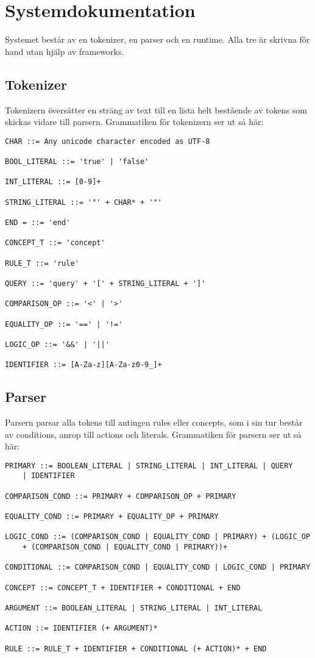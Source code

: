 \documentclass{TDP005mall}
\begin{document}
\section{Systemdokumentation}
Systemet består av en tokenizer, en parser och en runtime. Alla tre är skrivna för hand
utan hjälp av frameworks.

\subsection{Tokenizer}
Tokenizern översätter en sträng av text till en lista helt bestående av tokens som skickas
vidare till parsern. Grammatiken för tokenizern ser ut så här:

\begin{lstlisting}
CHAR ::= Any unicode character encoded as UTF-8

BOOL_LITERAL ::= 'true' | 'false'

INT_LITERAL ::= [0-9]+

STRING_LITERAL ::= '"' + CHAR* + '"'

END = ::= 'end'

CONCEPT_T ::= 'concept'

RULE_T ::= 'rule'

QUERY ::= 'query' + '[' + STRING_LITERAL + ']'

COMPARISON_OP ::= '<' | '>'

EQUALITY_OP ::= '==' | '!='

LOGIC_OP ::= '&&' | '||'

IDENTIFIER ::= [A-Za-z][A-Za-z0-9_]+
\end{lstlisting}

\subsection{Parser}
 Parsern parsar alla tokens till antingen rules eller concepts,
som i sin tur består av conditions, anrop till actions och literals. Grammatiken för parsern ser
ut så här:
\begin{lstlisting}
PRIMARY ::= BOOLEAN_LITERAL | STRING_LITERAL | INT_LITERAL | QUERY
    | IDENTIFIER

COMPARISON_COND ::= PRIMARY + COMPARISON_OP + PRIMARY

EQUALITY_COND ::= PRIMARY + EQUALITY_OP + PRIMARY

LOGIC_COND ::= (COMPARISON_COND | EQUALITY_COND | PRIMARY) + (LOGIC_OP
    + (COMPARISON_COND | EQUALITY_COND | PRIMARY))+

CONDITIONAL ::= COMPARISON_COND | EQUALITY_COND | LOGIC_COND | PRIMARY

CONCEPT ::= CONCEPT_T + IDENTIFIER + CONDITIONAL + END

ARGUMENT ::= BOOLEAN_LITERAL | STRING_LITERAL | INT_LITERAL

ACTION ::= IDENTIFIER (+ ARGUMENT)*

RULE ::= RULE_T + IDENTIFIER + CONDITIONAL (+ ACTION)* + END
\end{lstlisting}
\end{document}
